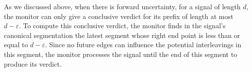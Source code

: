 As we discussed above, when there is forward uncertainty, for a signal of length $d$, the monitor can only give a conclusive verdict for its prefix of length at most $d-\varepsilon$.
To compute this conclusive verdict, the monitor finds in the signal's canonical segmentation the latest segment whose right end point is less than or equal to $d-\varepsilon$.
Since no future edges can influence the potential interleavings in this segment, the monitor processes the signal until the end of this segment to produce its verdict.


